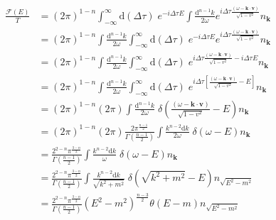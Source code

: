 \documentclass[12pt]{article}
\numberwithin{equation}{section}
\theoremstyle{1style}
\newcommand{\id}{\mathrm{d}}
\begin{document}
\begin{align}
  \frac{\mathcal{F}(E)}{T} & = (2\pi)^{1-n}\int^{\infty}_{-\infty}\id (\Delta \tau)\;e^{-i\Delta\tau E}
  \int\frac{\id^{n-1}k}{2\omega}e^{i\Delta\tau\frac{(\omega-\mathbf{k}\cdot\mathbf{v})}{\sqrt{1-v^2}}}n_{\mathbf{k}}                  \\
                           & = (2\pi)^{1-n}\int\frac{\id^{n-1}k}{2\omega}\int^{\infty}_{-\infty}\id (\Delta \tau)\;e^{-i\Delta\tau E}
  e^{i\Delta\tau\frac{(\omega-\mathbf{k}\cdot\mathbf{v})}{\sqrt{1-v^2}}}n_{\mathbf{k}}                                                \\
                           & = (2\pi)^{1-n}\int\frac{\id^{n-1}k}{2\omega}\int^{\infty}_{-\infty}\id (\Delta \tau)\;
  e^{i\Delta\tau\frac{(\omega-\mathbf{k}\cdot\mathbf{v})}{\sqrt{1-v^2}}-i\Delta\tau E}n_{\mathbf{k}}                                  \\
                           & = (2\pi)^{1-n}\int\frac{\id^{n-1}k}{2\omega}\int^{\infty}_{-\infty}\id (\Delta \tau)\;
  e^{i\Delta\tau\left[\frac{(\omega-\mathbf{k}\cdot\mathbf{v})}{\sqrt{1-v^2}}-E\right]}n_{\mathbf{k}}                                 \\
                           & = (2\pi)^{1-n}(2\pi)\int\frac{\id^{n-1}k}{2\omega}\;
  \delta\left(\frac{(\omega-\mathbf{k}\cdot\mathbf{v})}{\sqrt{1-v^2}}-E\right)n_{\mathbf{k}}                                          \\
                           & = (2\pi)^{1-n}(2\pi)\frac{2\pi^{\frac{n-1}{2}}}{\Gamma(\frac{n-1}{2})}\int\frac{k^{n-2}\id k}{2\omega}\;
  \delta\left(\omega-E\right)n_{\mathbf{k}}                                                                                           \\
                           & = \frac{2^{2-n}\pi^{\frac{3-n}{2}}}{\Gamma(\frac{n-1}{2})}\int\frac{k^{n-2}\id k}{\omega}\;
  \delta\left(\omega-E\right)n_{\mathbf{k}}                                                                                           \\
                           & = \frac{2^{2-n}\pi^{\frac{3-n}{2}}}{\Gamma(\frac{n-1}{2})}\int\frac{k^{n-2}\id k}{\sqrt{k^2+m^2}}\;
  \delta\left(\sqrt{k^2+m^2}-E\right)n_{\sqrt{E^2-m^2}}                                                                               \\
                           & = \frac{2^{2-n}\pi^{\frac{3-n}{2}}}{\Gamma(\frac{n-1}{2})}\left(E^2-m^2\right)^{\frac{n-3}{2}}
  \theta\left(E-m\right)n_{\sqrt{E^2-m^2}}
\end{align}
\end{document}
